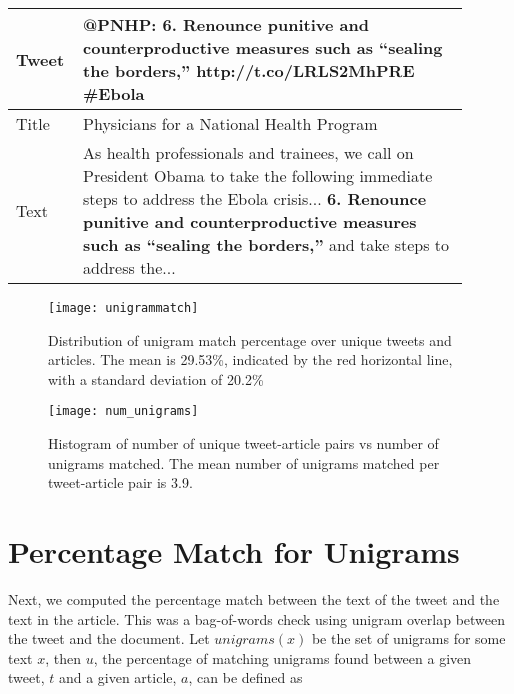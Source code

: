 \begin{table}[!htbp]
\centering
\begin{tabular}{|p{0.1\linewidth}|p{0.8\linewidth}|}
\hline
Tweet &  @PNHP: \textbf{6. Renounce punitive and counterproductive measures such as “sealing the borders,”} http://t.co/LRLS2MhPRE \#Ebola \\ \hline
Title & Physicians for a National Health Program \\  \hline
Text  & As health professionals and trainees, we call on President Obama to take the following immediate steps to address the Ebola crisis... \textbf{6. Renounce punitive and counterproductive measures such as “sealing the borders,”} and take steps to address the... \\ \hline
\end{tabular}
\label{tab:fullextract}
\end{table}


\begin{figure}[!htbp]
\centering
\texttt{[image: unigrammatch]}
\caption[Unigram matching percentages]{Distribution of unigram match percentage over unique tweets and articles. The mean is 29.53\%, indicated by the red horizontal line, with a standard deviation of 20.2\%}
\label{fig:unigrammatch}
\end{figure}


\begin{figure}[!htbp]
\centering
\texttt{[image: num\_unigrams]}
\caption[Histogram for number of unigrams matched]{Histogram of number of unique tweet-article pairs vs number of unigrams matched. The mean number of unigrams matched per tweet-article pair is 3.9.}
\label{fig:num_unigrams}
\end{figure}


\section{Percentage Match for Unigrams}
\label{sec:unigrams}

Next, we computed the percentage match between the text of the tweet and the text in the article. This was a bag-of-words check using unigram overlap between the tweet and the document. Let $\textit{unigrams}(x)$ be the set of unigrams for some text $x$, then $u$, the percentage of matching unigrams found between a given tweet, $t$ and a given article, $a$, can be defined as  

